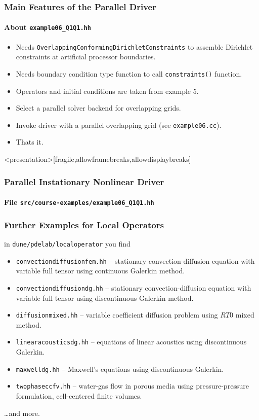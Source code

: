 \begin{frame}
\frametitle{Main Features of the Parallel Driver}
\framesubtitle{About \lstinline{example06_Q1Q1.hh}}
\begin{itemize}
\item Needs \lstinline{OverlappingConformingDirichletConstraints}
to assemble Dirichlet constraints at artificial processor boundaries.
\item Needs boundary condition type function to call \lstinline{constraints()} function.
\item Operators and initial conditions are taken from example 5.
\item Select a parallel solver backend for overlapping grids.
\item Invoke driver with a parallel overlapping grid (see \lstinline{example06.cc}).
\item Thats it.
\end{itemize}
\end{frame}

\begin{frame}<presentation>[fragile,allowframebreaks,allowdisplaybreaks]
\frametitle<presentation>{Parallel Instationary Nonlinear Driver}
\framesubtitle<presentation>{File \texttt{src/course-examples/example06\_Q1Q1.hh}}

\end{frame}

\begin{frame}
\frametitle{Further Examples for Local Operators}
in \lstinline{dune/pdelab/localoperator} you find
\begin{itemize}
\item \lstinline{convectiondiffusionfem.hh} -- stationary convection-diffusion equation with variable full tensor using
continuous Galerkin method.
\item \lstinline{convectiondiffusiondg.hh} -- stationary convection-diffusion equation with variable full tensor using discontinuous
Galerkin method.
\item \lstinline{diffusionmixed.hh} -- variable coefficient diffusion problem using $RT0$ mixed method.
\item \lstinline{linearacousticsdg.hh} -- equations of linear acoustics using discontinuous Galerkin.
\item \lstinline{maxwelldg.hh} -- Maxwell's equations using discontinuous Galerkin.
\item \lstinline{twophaseccfv.hh} -- water-gas flow in porous media using pressure-pressure formulation,
cell-centered finite volumes.
\end{itemize}
\ldots and more.
\end{frame}


\cleardoublepage

